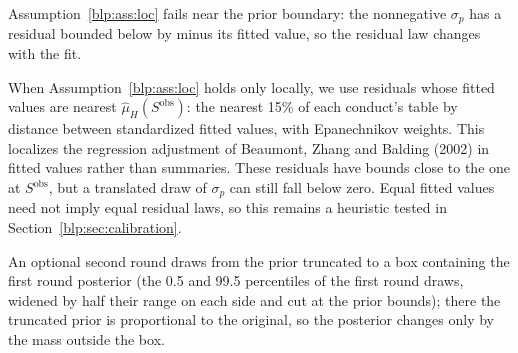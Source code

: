Assumption~\ref{blp:ass:loc} fails near the prior boundary: the nonnegative $\sigma_p$ has a residual bounded below by minus its fitted value, so the residual law changes with the fit.

When Assumption~\ref{blp:ass:loc} holds only locally, we use residuals whose fitted values are nearest $\hat\mu_H(S^{\mathrm{obs}})$: the nearest 15\% of each conduct's table by distance between standardized fitted values, with Epanechnikov weights. This localizes the regression adjustment of Beaumont, Zhang and Balding (2002) in fitted values rather than summaries. These residuals have bounds close to the one at $S^{\mathrm{obs}}$, but a translated draw of $\sigma_p$ can still fall below zero. Equal fitted values need not imply equal residual laws, so this remains a heuristic tested in Section~\ref{blp:sec:calibration}.

An optional second round draws from the prior truncated to a box containing the first round posterior (the 0.5 and 99.5 percentiles of the first round draws, widened by half their range on each side and cut at the prior bounds); there the truncated prior is proportional to the original, so the posterior changes only by the mass outside the box.



